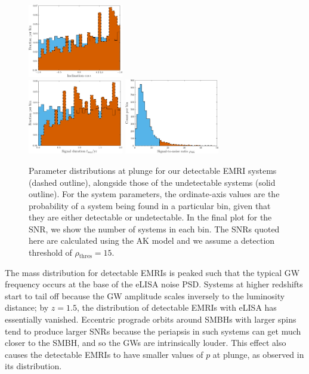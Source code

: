 \documentclass[aps,prd,amsfonts,amssymb,amsmath,nofootinbib,showpacs,superscriptaddress,twocolumn,floatfix]{revtex4-1}
\newcommand{\sub}[1]{\ensuremath{_\mathrm{#1}}}
\begin{document}
\begin{figure}
\includegraphics[width=0.37\textwidth]{Fig_res_pop_iota} \\ \vspace{0.1cm}
\includegraphics[width=0.37\textwidth]{Fig_res_pop_t} \quad
\includegraphics[width=0.37\textwidth]{Fig_res_pop_SNR}
\caption{\label{fig:EMRIpar-dists}Parameter distributions at plunge for our detectable EMRI systems (dashed outline), alongside those of the undetectable systems (solid outline). For the system parameters, the ordinate-axis values are the probability of a system being found in a particular bin, given that they are either detectable or undetectable. In the final plot for the SNR, we show the number of systems in each bin. The SNRs quoted here are calculated using the AK model and we assume a detection threshold of $\rho\sub{thres} = 15$.}
\end{figure}

The mass distribution for detectable EMRIs is peaked such that the typical GW frequency occurs at the base of the eLISA noise PSD. Systems at higher redshifts start to tail off because the GW amplitude scales inversely to the luminosity distance; by $z = 1.5$, the distribution of detectable EMRIs with eLISA has essentially vanished. Eccentric prograde orbits around SMBHs with larger spins tend to produce larger SNRs because the periapsis in such systems can get much closer to the SMBH, and so the GWs are intrinsically louder. This effect also causes the detectable EMRIs to have smaller values of $p$ at plunge, as observed in its distribution.
\end{document}
